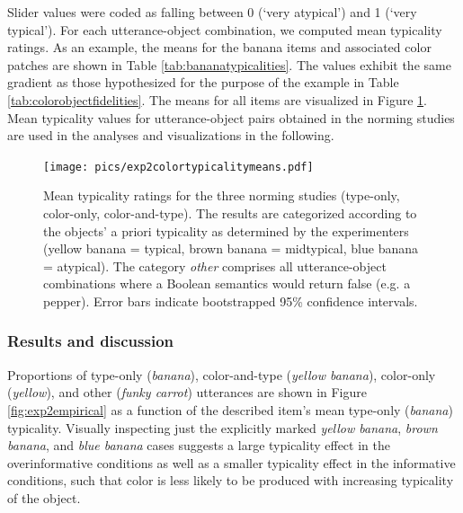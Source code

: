 \documentclass[11pt]{article}
\newcommand{\ndg}[1]{\textcolor{Green}{[ndg: #1]}}
\newcommand{\tableref}[1]{Table \ref{#1}}
\newcommand{\figref}[1]{Figure \ref{#1}}
\begin{document}
Slider values were coded as falling between 0 (`very atypical') and 1 (`very typical'). 
For each utterance-object combination, we computed mean typicality ratings. 
As an example, the means for the banana items and associated color patches are shown in \tableref{tab:bananatypicalities}. 
The values exhibit the same gradient as those hypothesized for the purpose of the example in \tableref{tab:colorobjectfidelities}. 
The means for all items are visualized in \figref{fig:exp2colortypicalitymeans}.
Mean typicality values for utterance-object pairs obtained in the norming studies are used in the analyses and visualizations in the following.

\begin{figure}
	\centering
	\texttt{[image: pics/exp2colortypicalitymeans.pdf]}
	\caption{Mean typicality ratings for the three norming studies (type-only, color-only, color-and-type). The results are categorized according to the objects' a priori typicality as determined by the experimenters (yellow banana = typical, brown banana = midtypical, blue banana = atypical). The category \emph{other} comprises all utterance-object combinations where a Boolean semantics would return false (e.g. a pepper). Error bars indicate bootstrapped 95\% confidence intervals.}
	\label{fig:exp2colortypicalitymeans}
\end{figure}


\subsubsection{Results and discussion}
\label{sec:exp2resultsdisc}

Proportions of type-only (\emph{banana}), color-and-type (\emph{yellow banana}), color-only (\emph{yellow}), and other (\emph{funky carrot}) utterances are shown in \figref{fig:exp2empirical} as a function of the described item's mean type-only (\emph{banana}) typicality. Visually inspecting just the explicitly marked \emph{yellow banana}, \emph{brown banana}, and \emph{blue banana} cases suggests a large typicality effect in the overinformative conditions as well as a smaller typicality effect in the informative conditions, such that color is less likely to be produced with increasing typicality of the object. 
\end{document}
